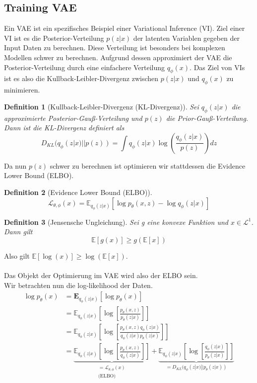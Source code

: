 \documentclass[%
thesis=student,%
coverpage=false,%
titlepage=false,%
headmarks=true, %
german,%
font=libertine, %
math=newpxtx, %
BCOR=5mm,%
coverBCOR=11mm%
]{tumbook}
\theoremstyle{break}
\newtheorem{definition}{Definition}[section]
\begin{document}
\subsection{Training VAE}
Ein VAE ist ein spezifisches Beispiel einer Variational Inference (VI). Ziel einer VI ist es die Posterior-Verteilung $p(z|x)$ der latenten Variablen gegeben der Input Daten zu berechnen. Diese Verteilung ist besonders bei komplexen Modellen schwer zu berechnen. Aufgrund dessen approximiert der VAE die Posterior-Verteilung durch eine einfachere Verteilung $q_\phi(x)$. Das Ziel von VIs ist es also die Kullback-Leibler-Divergenz zwischen $p(z|x)$ und $q_\phi(x)$ zu minimieren. 
\begin{definition}[Kullback-Leibler-Divergenz (KL-Divergenz)]
Sei $q_\phi(z|x)$ die approximierte Posterior-Gauß-Verteilung und $p(z)$ die Prior-Gauß-Verteilung. Dann ist die KL-Divergenz definiert als
$$D_{KL}(q_\phi(z|x)||p(z))= \int q_\phi(z|x) \log \left(\frac{q_\phi(z|x)}{p(z)} \right)dz$$
\end{definition}\noindent
Da nun $p(z)$ schwer zu berechnen ist optimieren wir stattdessen die Evidence Lower Bound (ELBO).
\begin{definition}[Evidence Lower Bound (ELBO)]
$$ \mathcal{L}_{\theta,\phi}(x) = \mathbb{E}_{q_\phi(z|x)}[\log p_\theta(x,z) - \log q_\phi(z|x)] $$ 
\end{definition}\noindent
\begin{definition}[Jensensche Ungleichung]
	Sei g eine konvexe Funktion und  $x\in \mathcal{L^1}$. Dann gilt
	$$ \mathbb{E}[g(x)] \geq g(\mathbb{E}[x]) $$ 
\end{definition} \noindent
Also gilt $ \mathbb{E}[\log(x)] \geq \log(\mathbb{E}[x]) $.\\
\\
Das Objekt der Optimierung im VAE wird also der ELBO sein. \\
Wir betrachten nun die log-likelihood der Daten.\\
\begin{align}
 	\log p_\theta(x) &= \mathbf{E}_{q_\phi(z|x)}[\log p_\theta(x)] \\
 	&= \mathbb{E}_{q_\phi(z|x)}\left[\log\left[ \frac{p_\theta(x,z)}{p_\theta(z|x)}\right]\right] \\
 	&= \mathbb{E}_{q_\phi(z|x)}\left[\log\left[ \frac{p_\theta(x,z)q_\phi(z|x)}{q_\phi(z|x)p_\theta(z|x)}\right]\right] \\
 	&= \underbrace{\mathbb{E}_{q_\phi(z|x)}\left[\log\left[ \frac{p_\theta(x,z)}{q_\phi(z|x)}\right]\right]}_{\substack{\text{$= \mathcal{L}_{\theta,\phi}(x)$}\\\text{(ELBO)}}} + \underbrace{\mathbb{E}_{q_\phi(z|x)}\left[\log\left[ \frac{q_\phi(z|x)}{p_\theta(z|x)}\right]\right]}_{=D_{KL}(q_\phi(z|x)||p_\theta(z|x))}
\end{align}\noindent
\end{document}
